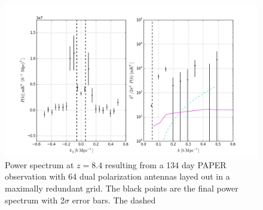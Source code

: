 \documentclass[twocolumn,numberedappendix]{emulateapj} \shorttitle{PSA64}
\begin{document}
%
%
%
%
%
%
%
%
%
%


\begin{figure}[h!]\centering
\includegraphics[width=2\columnwidth,height=1.2\columnwidth]{plots/pk_k3pk.png}
\caption{
Power spectrum at $z=8.4$ resulting from a 134 day PAPER observation
with 64 dual polarization antennas layed out in a maximally redundant grid. The
black points are the final power spectrum with 2$\sigma$ error bars. The dashed
}
\end{figure}
\end{document}
